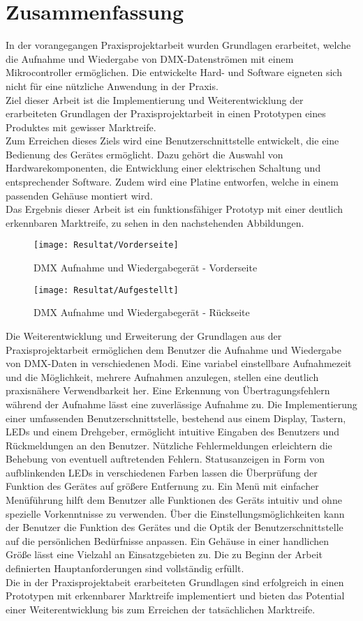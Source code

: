 \newpage
\section{Zusammenfassung}
In der vorangegangen Praxisprojektarbeit wurden Grundlagen erarbeitet, welche die Aufnahme und Wiedergabe von DMX-Datenströmen mit einem Mikrocontroller ermöglichen. Die entwickelte Hard- und Software eigneten sich nicht für eine nützliche Anwendung in der Praxis.\\
Ziel dieser Arbeit ist die Implementierung und Weiterentwicklung der erarbeiteten Grundlagen der Praxisprojektarbeit in einen Prototypen eines Produktes mit gewisser Marktreife.\\
Zum Erreichen dieses Ziels wird eine Benutzerschnittstelle entwickelt, die eine Bedienung des Gerätes ermöglicht. Dazu gehört die Auswahl von Hardwarekomponenten, die Entwicklung einer elektrischen Schaltung und entsprechender Software. Zudem wird eine Platine entworfen, welche in einem passenden Gehäuse montiert wird.\\
Das Ergebnis dieser Arbeit ist ein funktionsfähiger Prototyp mit einer deutlich erkennbaren Marktreife, zu sehen in den nachstehenden Abbildungen.
\begin{figure}[h]
	\begin{minipage}{.45\linewidth}
		\centering
		\texttt{[image: Resultat/Vorderseite]}
		\caption{DMX Aufnahme und Wiedergabegerät - Vorderseite}
	\end{minipage}
	\hfill
	\begin{minipage}{.45\linewidth}
		\texttt{[image: Resultat/Aufgestellt]}
		\caption{DMX Aufnahme und Wiedergabegerät - Rückseite}
	\end{minipage}
\end{figure}
Die Weiterentwicklung und Erweiterung der Grundlagen aus der Praxisprojektarbeit ermöglichen dem Benutzer die Aufnahme und Wiedergabe von DMX-Daten in verschiedenen Modi. Eine variabel einstellbare Aufnahmezeit und die Möglichkeit, mehrere Aufnahmen anzulegen, stellen eine deutlich praxisnähere Verwendbarkeit her. Eine Erkennung von Übertragungsfehlern während der Aufnahme lässt eine zuverlässige Aufnahme zu. Die Implementierung einer umfassenden Benutzerschnittstelle, bestehend aus einem Display, Tastern, LEDs und einem Drehgeber, ermöglicht intuitive Eingaben des Benutzers und Rückmeldungen an den Benutzer. Nützliche Fehlermeldungen erleichtern die Behebung von eventuell auftretenden Fehlern. Statusanzeigen in Form von aufblinkenden LEDs in verschiedenen Farben lassen die Überprüfung der Funktion des Gerätes auf größere Entfernung zu. Ein Menü mit einfacher Menüführung hilft dem Benutzer alle Funktionen des Geräts intuitiv und ohne spezielle Vorkenntnisse zu verwenden. Über die Einstellungsmöglichkeiten kann der Benutzer die Funktion des Gerätes und die Optik der Benutzerschnittstelle auf die persönlichen Bedürfnisse anpassen. Ein Gehäuse in einer handlichen Größe lässt eine Vielzahl an Einsatzgebieten zu. Die zu Beginn der Arbeit definierten Hauptanforderungen sind vollständig erfüllt.\\%
Die in der Praxisprojektabeit erarbeiteten Grundlagen sind erfolgreich in einen Prototypen mit erkennbarer Marktreife implementiert und bieten das Potential einer Weiterentwicklung bis zum Erreichen der tatsächlichen Marktreife. 
